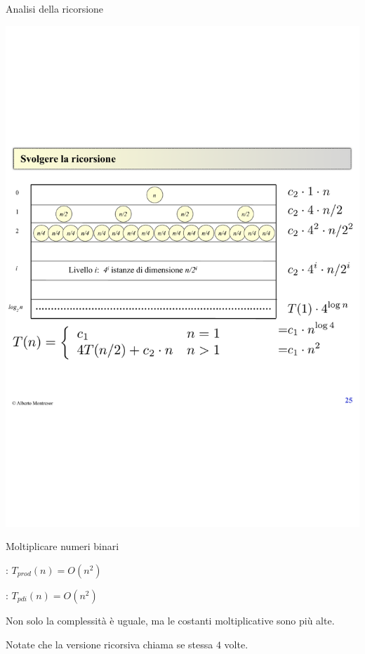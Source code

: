 \begin{frame}{Analisi della ricorsione}

\includegraphics[width=\textwidth]{ricorsione.pdf}

\end{frame}

\begin{frame}{Moltiplicare numeri binari}

\begin{myboxtitle}
\BI
\item {}: $T_{prod}(n) = O(n^2)$
\item {}: $T_{pdi}(n) = O(n^2)$
\EI
\end{myboxtitle}

\smallskip
\begin{myboxtitle}
Non solo la complessità è uguale, ma le costanti moltiplicative 
sono più alte.	
\end{myboxtitle}

\smallskip
\begin{myboxtitle}
Notate che la versione ricorsiva chiama se stessa $4$ volte.
\end{myboxtitle} 

\end{frame}

